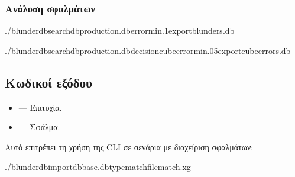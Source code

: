 \documentclass[letterpaper,10pt,greek]{sphinxmanual}
\begin{document}
\subsubsection{Ανάλυση σφαλμάτων}
\label{\detokenize{cli:analyse-des-erreurs}}
\begin{sphinxVerbatim}[commandchars=\\\{\}]
./blunderdbsearch\PYGZhy{}\PYGZhy{}dbproduction.db\PYGZhy{}\PYGZhy{}error\PYGZhy{}min.1\PYGZhy{}\PYGZhy{}exportblunders.db

./blunderdbsearch\PYGZhy{}\PYGZhy{}dbproduction.db\PYGZhy{}\PYGZhy{}decisioncube\PYGZhy{}\PYGZhy{}error\PYGZhy{}min.05\PYGZhy{}\PYGZhy{}exportcube\PYGZus{}errors.db
\end{sphinxVerbatim}


\subsection{Κωδικοί εξόδου}
\label{\detokenize{cli:codes-de-retour}}\begin{itemize}
\item {} 
\sphinxAtStartPar
{} — Επιτυχία.

\item {} 
\sphinxAtStartPar
{} — Σφάλμα.

\end{itemize}

\sphinxAtStartPar
Αυτό επιτρέπει τη χρήση της CLI σε σενάρια με διαχείριση σφαλμάτων:

\begin{sphinxVerbatim}[commandchars=\\\{\}]
./blunderdbimport\PYGZhy{}\PYGZhy{}dbbase.db\PYGZhy{}\PYGZhy{}typematch\PYGZhy{}\PYGZhy{}filematch.xg
\end{sphinxVerbatim}
\end{document}
